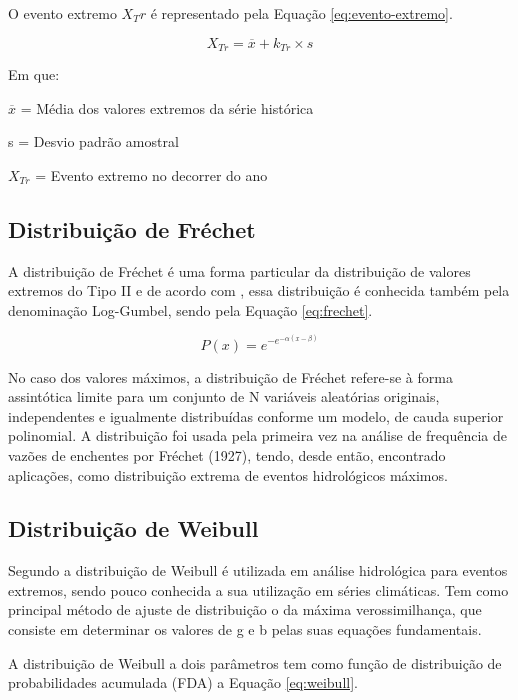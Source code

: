 O evento extremo $X_Tr$ é representado pela Equação \ref{eq:evento-extremo}.

\begin{equation}
\label{eq:evento-extremo}
    X_{Tr} = \overline{x} + k_{Tr} \times s
\end{equation}

Em que:

$\overline{x}$ = Média dos valores extremos da série histórica

s = Desvio padrão amostral

$X_{Tr}$ = Evento extremo no decorrer do ano

\subsection{Distribuição de Fréchet}

A distribuição de Fréchet é uma forma particular da distribuição de valores extremos do Tipo II e de acordo com , essa distribuição é conhecida também pela denominação Log-Gumbel, sendo pela Equação \ref{eq:frechet}.

\begin{equation}
\label{eq:frechet}
    P(x) = e^{-e^{-\alpha(x-\beta)}}
\end{equation}

No caso dos valores máximos, a distribuição de Fréchet refere-se à forma assintótica limite para um conjunto de N variáveis aleatórias originais, independentes e igualmente distribuídas conforme um modelo, de cauda superior polinomial. A distribuição foi usada pela primeira vez na análise de frequência de vazões de enchentes por Fréchet (1927), tendo, desde então, encontrado aplicações, como distribuição extrema de eventos hidrológicos máximos.

\subsection{Distribuição de Weibull}

Segundo  a distribuição de Weibull é utilizada em análise hidrológica para eventos extremos, sendo pouco conhecida a sua utilização em séries climáticas. Tem como principal método de ajuste de distribuição o da máxima verossimilhança, que consiste em determinar os valores de g e b pelas suas equações fundamentais.

A distribuição de Weibull a dois parâmetros tem como função de distribuição de probabilidades acumulada (FDA) a Equação \ref{eq:weibull}.

